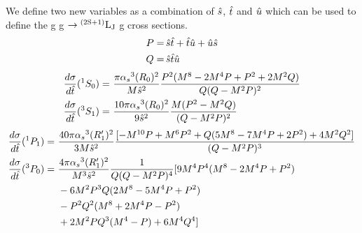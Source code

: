 \documentclass[aps,prc,preprint,superscriptaddress,showpacs,showkeys,amsmath]{revtex4-1}
\begin{document}
\begin{itemize}
We define two new variables as a combination of ${\hat{s}}$, ${\hat{t}}$ and ${\hat{u}}$ which 
can be used to define the g g $\rightarrow {\rm ^{(2S+1)}L_{J}}$ g cross sections.
\begin{equation}
\begin{split}
  P = & \,{\hat{s}}{\hat{t}} + {\hat{t}}{\hat{u}} + {\hat{u}}{\hat{s}} \\
  Q = & \,{\hat{s}}{\hat{t}}{\hat{u}}\\
\end{split} 
\end{equation}
\begin{equation}
\begin{split}
\frac{d\sigma}{d{\hat{t}}}(^1S_0) = ~&\frac{\pi {\alpha_{s}}^3 (R_{0})^{2}}{M{\hat{s}}^2}\frac{P^2(M^8-2M^4P+P^2+2M^2Q)}{Q(Q-M^2P)^2}\\
\frac{d\sigma}{d{\hat{t}}}(^3S_1) = ~&\frac{10\pi {\alpha_{s}}^3 (R_{0})^{2}}{9{\hat{s}}^2}\frac{M(P^2-M^2Q)}{(Q-M^2P)^2}\\
\end{split}  
\end{equation}
\begin{equation}
\begin{split}
\frac{d\sigma}{d{\hat{t}}}(^1P_1) = ~&\frac{40\pi {\alpha_{s}}^3 (R_{1}^\prime)^{2}}{3M{\hat{s}}^2}\frac{[-M^{10}P + M^6P^2 + Q(5M^8-7M^4P+2P^2)+4M^2Q^2]}{(Q-M^2P)^3}\\
\frac{d\sigma}{d{\hat{t}}}(^3P_0) = ~&\frac{4\pi {\alpha_{s}}^3 (R_{1}^\prime)^{2}}{M^3{\hat{s}}^2}\frac{1}{Q(Q-M^2P)^4}[9M^4P^4(M^8-2M^4P+P^2)\\
                              ~&-6M^2P^3Q(2M^8-5M^4P+P^2)\\
                              ~&-P^2Q^2(M^8+2M^4P-P^2)\\
                              ~&+2M^2PQ^3(M^4-P)+6M^4Q^4]
\end{split}  
\end{equation}
\begin{equation}

\end{equation}
\end{itemize}
\end{document}
